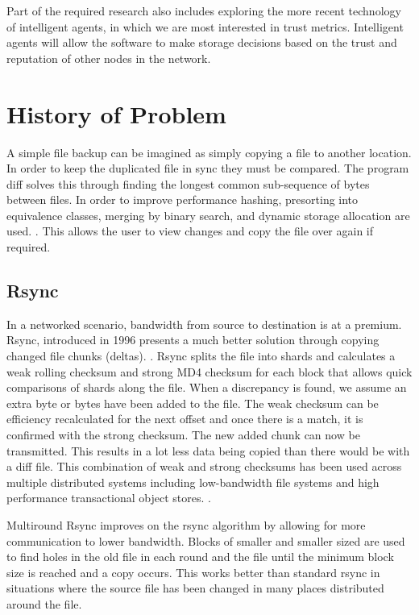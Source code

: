 \documentclass[a4paper,11pt, twocolumn]{report}
\begin{document}
Part of the required research also includes exploring the more recent technology of intelligent agents, in which we are most interested in trust metrics. Intelligent agents will allow the software to make storage decisions based on the trust and reputation of other nodes in the network.

\section{History of Problem}

A simple file backup can be imagined as simply copying a file to another location. In order to keep the duplicated file in sync they must be compared. The program diff solves this through finding the longest common sub-sequence of bytes between files. In order to improve performance hashing, presorting into equivalence classes, merging by binary search, and dynamic storage allocation are used. \citep{hunt1976algorithm}. This allows the user to view changes and copy the file over again if required.

\subsection{Rsync}
In a networked scenario, bandwidth from source to destination is at a premium. Rsync, introduced in 1996 presents a much better solution through copying changed file chunks (deltas). \citep{tridgell1996rsync}. Rsync splits the file into shards and calculates a weak rolling checksum and strong MD4 checksum for each block that allows quick comparisons of shards along the file. When a discrepancy is found, we assume an extra byte or bytes have been added to the file. The weak checksum can be efficiency recalculated for the next offset and once there is a match, it is confirmed with the strong checksum. The new added chunk can now be transmitted. This results in a lot less data being copied than there would be with a diff file. \citep{tridgell1996rsync} This combination of weak and strong checksums has been used across multiple distributed systems including low-bandwidth file systems \citep{muthitacharoen2001low} and high performance transactional object stores. \citep{stephen2000platypus}.

Multiround Rsync improves on the rsync algorithm by allowing for more communication to lower bandwidth. Blocks of smaller and smaller sized are used to find holes in the old file in each round and the file until the minimum block size is reached and a copy occurs. \citep{multiroundrsync} This works better than standard rsync in situations where the source file has been changed in many places distributed around the file.
\end{document}
